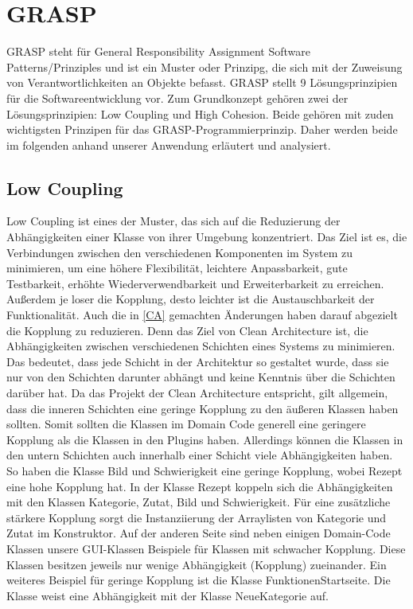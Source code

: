 \section{GRASP}
GRASP steht für General Responsibility Assignment Software Patterns/Prinziples und ist ein Muster oder Prinzipg, die sich mit der Zuweisung von Verantwortlichkeiten an Objekte befasst. GRASP stellt 9 Lösungsprinzipien für die Softwareentwicklung vor. Zum Grundkonzept gehören zwei der Lösungsprinzipien: Low Coupling und High Cohesion. Beide gehören mit zuden wichtigsten Prinzipen für das GRASP-Programmierprinzip. Daher werden beide im folgenden anhand unserer Anwendung erläutert und analysiert.

\subsection{Low Coupling}
Low Coupling ist eines der Muster, das sich auf die Reduzierung der Abhängigkeiten einer Klasse von ihrer Umgebung konzentriert. Das Ziel ist es, die Verbindungen zwischen den verschiedenen Komponenten im System zu minimieren, um eine höhere Flexibilität, leichtere Anpassbarkeit, gute Testbarkeit, erhöhte Wiederverwendbarkeit und Erweiterbarkeit zu erreichen. Außerdem je loser die Kopplung, desto leichter ist die Austauschbarkeit der Funktionalität.
Auch die in \autoref{CA} gemachten Änderungen haben darauf abgezielt die Kopplung zu reduzieren. Denn das Ziel von Clean Architecture ist, die Abhängigkeiten zwischen verschiedenen Schichten eines Systems zu minimieren. Das bedeutet, dass jede Schicht in der Architektur so gestaltet wurde, dass sie nur von den Schichten darunter abhängt und keine Kenntnis über die Schichten darüber hat.
Da das Projekt der Clean Architecture entspricht, gilt allgemein, dass die inneren Schichten eine geringe Kopplung zu den äußeren Klassen haben sollten. 
Somit sollten die Klassen im Domain Code generell eine geringere Kopplung als die Klassen in den Plugins haben. Allerdings können die Klassen in den untern Schichten auch innerhalb einer Schicht viele Abhängigkeiten haben. So haben die Klasse Bild und Schwierigkeit eine geringe Kopplung, wobei Rezept eine hohe Kopplung hat.  
In der Klasse Rezept koppeln sich die Abhängigkeiten mit den Klassen Kategorie, Zutat, Bild und Schwierigkeit. Für eine zusätzliche stärkere Kopplung sorgt die Instanziierung der Arraylisten
von Kategorie und Zutat im Konstruktor.
Auf der anderen Seite sind neben einigen Domain-Code Klassen unsere GUI-Klassen Beispiele für Klassen mit schwacher Kopplung. Diese Klassen besitzen jeweils nur wenige Abhängigkeit (Kopplung) zueinander. 
Ein weiteres Beispiel für geringe Kopplung ist die Klasse FunktionenStartseite. Die Klasse weist eine Abhängigkeit mit
der Klasse NeueKategorie auf.

